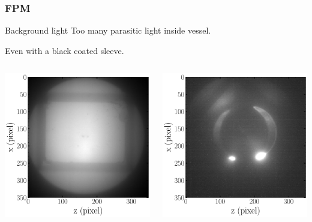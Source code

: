 \begin{frame}[t]
  \frametitle{FPM}
  \begin{block}{Background light}
    Too many parasitic light inside vessel.

    Even with a black coated sleeve.
  \end{block}
  \begin{columns}[T]
    \begin{column}{0.45\textwidth}
      \includegraphics[width=\textwidth]{06_Backup/fig/fig000_FPM_a.pdf}
    \end{column}
    \begin{column}{0.45\textwidth}
      \includegraphics[width=\textwidth]{06_Backup/fig/fig000_FPM_b.pdf}
    \end{column}
  \end{columns}
\end{frame}

